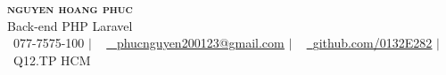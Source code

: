\documentclass[letterpaper,11pt]{article}
\begin{document}

\begin{center}
    {\Huge \scshape \textbf{nguyen hoang phuc}} \\ \vspace{2pt}          
    Back-end PHP Laravel \\ \vspace{2pt} 
    \small \raisebox{-0.1\height}\faPhone\ 077-7575-100  $|$ ~ 
    \href{mailto:phucnguyen200123@gmail.com}{\raisebox{-0.2\height}\faEnvelope\  \underline{ phucnguyen200123@gmail.com}}  $|$ ~
    \href{https://github.com/0132E282}{\raisebox{-0.2\height}\faGithub\ \underline{github.com/0132E282}}  $|$ ~
    \small \raisebox{-0.1\height}\faMapMarker\ Q12.TP HCM
    \vspace{-8pt}
\end{center}
\end{document}
